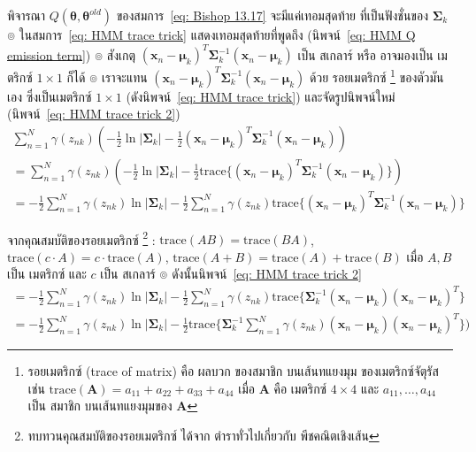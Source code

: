 พิจารณา $Q(\bm{\theta}, \bm{\theta}^{old})$ ของสมการ~\ref{eq: Bishop 13.17} จะมีแค่เทอมสุดท้าย ที่เป็นฟังชั่นของ $\bm{\Sigma}_k$
๏ ในสมการ~\ref{eq: HMM trace trick} แสดงเทอมสุดท้ายที่พูดถึง (นิพจน์~\ref{eq: HMM Q emission term})
๏ สังเกตุ $(\textbf{x}_n - \bm{\mu}_k)^T \bm{\Sigma}_k^{-1} (\textbf{x}_n - \bm{\mu}_k)$ เป็น	สเกลาร์ หรือ อาจมองเป็น เมตริกซ์ $1 \times 1$ ก็ได้
๏  เราจะแทน $(\textbf{x}_n - \bm{\mu}_k)^T \bm{\Sigma}_k^{-1} (\textbf{x}_n - \bm{\mu}_k)$ ด้วย รอยเมตริกซ์%
\footnote{
รอยเมตริกซ์ (trace of matrix) คือ ผลบวก ของสมาชิก บนเส้นทแยงมุม ของเมตริกซ์จัตุรัส เช่น
$\mathrm{trace}(\textbf{A}) = a_{11} + a_{22} + a_{33} + a_{44}$ เมื่อ $\textbf{A}$ คือ เมตริกซ์ $4 \times 4$ และ $a_{11}, \ldots, a_{44}$ เป็น สมาชิก บนเส้นทแยงมุมของ $\textbf{A}$
} ของตัวมันเอง ซึ่งเป็นเมตริกซ์ $1 \times 1$ (ดังนิพจน์~\ref{eq: HMM trace trick})
และจัดรูปนิพจน์ใหม่ (นิพจน์~\ref{eq: HMM trace trick 2})
\begin{eqnarray}
\sum_{n=1}^N \gamma (z_{nk}) \left( -\frac{1}{2} \ln | \bm{\Sigma}_k | -\frac{1}{2}  (\textbf{x}_n - \bm{\mu}_k)^T \bm{\Sigma}_k^{-1} (\textbf{x}_n - \bm{\mu}_k) \right)
\label{eq: HMM Q emission term} \\
=
\sum_{n=1}^N \gamma (z_{nk}) \left( -\frac{1}{2} \ln | \bm{\Sigma}_k | -\frac{1}{2} \mathrm{trace}\{  (\textbf{x}_n - \bm{\mu}_k)^T \bm{\Sigma}_k^{-1} (\textbf{x}_n - \bm{\mu}_k) \} \right)
\label{eq: HMM trace trick} \\
= -\frac{1}{2} \sum_{n=1}^N \gamma (z_{nk}) \ln | \bm{\Sigma}_k | -\frac{1}{2} \sum_{n=1}^N \gamma (z_{nk}) \mathrm{trace}\{  (\textbf{x}_n - \bm{\mu}_k)^T \bm{\Sigma}_k^{-1} (\textbf{x}_n - \bm{\mu}_k) \}
\label{eq: HMM trace trick 2}
\end{eqnarray}

จากคุณสมบัติของรอยเมตริกซ์%
\footnote{
ทบทวนคุณสมบัติของรอยเมตริกซ์ ได้จาก ตำราทั่วไปเกี่ยวกับ พีชคณิตเชิงเส้น
}%
: $\mathrm{trace}(A B) = \mathrm{trace}(B A)$,
$\mathrm{trace}(c \cdot A) = c \cdot  \mathrm{trace}(A)$,
$\mathrm{trace}(A + B) = \mathrm{trace}(A) + \mathrm{trace}(B)$ เมื่อ $A, B$ เป็น เมตริกซ์ และ $c$ เป็น สเกลาร์
๏ ดังนั้นนิพจน์~\ref{eq: HMM trace trick 2}
\begin{eqnarray}
= -\frac{1}{2} \sum_{n=1}^N \gamma (z_{nk}) \ln | \bm{\Sigma}_k | -\frac{1}{2} \sum_{n=1}^N \gamma (z_{nk}) \mathrm{trace}\{ 
\bm{\Sigma}_k^{-1} (\textbf{x}_n - \bm{\mu}_k) (\textbf{x}_n - \bm{\mu}_k)^T \}
\nonumber \\
= -\frac{1}{2} \sum_{n=1}^N \gamma (z_{nk}) \ln | \bm{\Sigma}_k | -\frac{1}{2} \mathrm{trace}\{ 
\bm{\Sigma}_k^{-1} \sum_{n=1}^N \gamma (z_{nk})(\textbf{x}_n - \bm{\mu}_k) (\textbf{x}_n - \bm{\mu}_k)^T \}
\label{eq: HMM trace trick 3})
\end{eqnarray}


